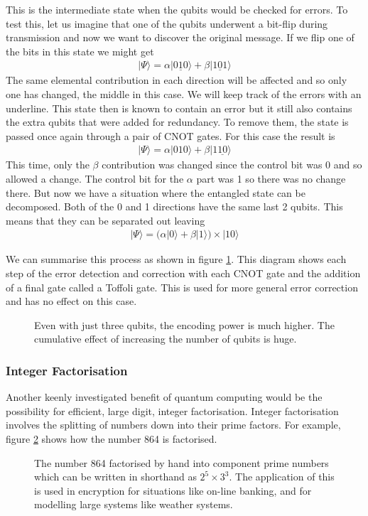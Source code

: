 This is the intermediate state when the qubits would be checked for errors. To test this, let us imagine that one of the qubits underwent a bit-flip during transmission and now we want to discover the original message. If we flip one of the bits in this state we might get
\begin{align}
	|\Psi\rangle = \alpha|0\underline{1}0\rangle + \beta|1\underline{0}1\rangle
\end{align}
The same elemental contribution in each direction will be affected and so only one has changed, the middle in this case. We will keep track of the errors with an underline. This state then is known to contain an error but it still also contains the extra qubits that were added for redundancy. To remove them, the state is passed once again through a pair of CNOT gates. For this case the result is
\begin{align}
	|\Psi\rangle = \alpha|010\rangle + \beta|1\underline{10}\rangle
\end{align}
This time, only the $\beta$ contribution was changed since the control bit was 0 and so allowed a change. The control bit for the $\alpha$ part was 1 so there was no change there. But now we have a situation where the entangled state can be decomposed. Both of the 0 and 1 directions have the same last 2 qubits. This means that they can be separated out leaving
\begin{align}
	|\Psi\rangle = \big(\alpha|0\rangle + \beta|1\rangle\big)\times|10\rangle
\end{align}

We can summarise this process as shown in figure \ref{fig:quantumerror}. This diagram shows each step of the error detection and correction with each CNOT gate and the addition of a final gate called a Toffoli gate. This is used for more general error correction and has no effect on this case.

\begin{figure}[ht]
	\centering
	 
	\caption{\label{fig:quantumerror}Even with just three qubits, the encoding power is much higher. The cumulative effect of increasing the number of qubits is huge.}
\end{figure}

\subsubsection{Integer Factorisation}
Another keenly investigated benefit of quantum computing would be the possibility for efficient, large digit, integer factorisation. Integer factorisation involves the splitting of numbers down into their prime factors. For example, figure \ref{fig:factors} shows how the number 864 is factorised.
\begin{figure}[ht]
	\centering
	\caption{\label{fig:factors}The number 864 factorised by hand into component prime numbers which can be written in shorthand as $2^5 \times 3^3$. The application of this is used in encryption for situations like on-line banking, and for modelling large systems like weather systems.}
\end{figure}

